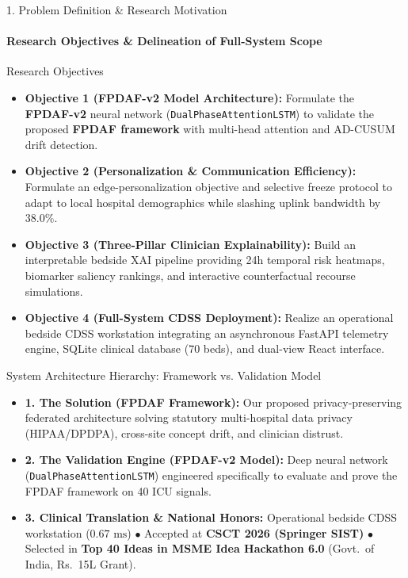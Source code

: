 \documentclass[aspectratio=169, 11pt]{beamer}
\begin{document}
\begin{frame}{1. Problem Definition \& Research Motivation}
    \framesubtitle{Research Objectives \& Delineation of Full-System Scope}
    \begin{block}{Research Objectives}
        \scriptsize
        \begin{itemize}
            \item \textbf{Objective 1 (FPDAF-v2 Model Architecture):} Formulate the \textbf{FPDAF-v2} neural network (\texttt{DualPhaseAttentionLSTM}) to validate the proposed \textbf{FPDAF framework} with multi-head attention and AD-CUSUM drift detection.
            \item \textbf{Objective 2 (Personalization \& Communication Efficiency):} Formulate an edge-personalization objective and selective freeze protocol to adapt to local hospital demographics while slashing uplink bandwidth by $38.0\%$.
            \item \textbf{Objective 3 (Three-Pillar Clinician Explainability):} Build an interpretable bedside XAI pipeline providing 24h temporal risk heatmaps, biomarker saliency rankings, and interactive counterfactual recourse simulations.
            \item \textbf{Objective 4 (Full-System CDSS Deployment):} Realize an operational bedside CDSS workstation integrating an asynchronous FastAPI telemetry engine, SQLite clinical database ($70$ beds), and dual-view React interface.
        \end{itemize}
    \end{block}
    \vspace{-0.10cm}

    \begin{block}{System Architecture Hierarchy: Framework vs. Validation Model}
        \scriptsize
        \begin{itemize}
            \item \textbf{1. The Solution (FPDAF Framework):} Our proposed privacy-preserving federated architecture solving statutory multi-hospital data privacy (HIPAA/DPDPA), cross-site concept drift, and clinician distrust.
            \item \textbf{2. The Validation Engine (FPDAF-v2 Model):} Deep neural network (\texttt{DualPhaseAttentionLSTM}) engineered specifically to evaluate and prove the FPDAF framework on 40 ICU signals.
            \item \textbf{3. Clinical Translation \& National Honors:} Operational bedside CDSS workstation ($0.67\text{ ms}$) $\bullet$ Accepted at \textbf{CSCT 2026 (Springer SIST)} $\bullet$ Selected in \textbf{Top 40 Ideas in MSME Idea Hackathon 6.0} (Govt.\ of India, Rs.~15L Grant).
        \end{itemize}
    \end{block}
\end{frame}
\end{document}
